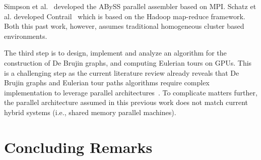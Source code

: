 \documentclass{acm_proc_article-sp}[12pt]
\begin{document}
Simpson et al.~\cite{simpson2009abyss} developed the ABySS parallel assembler based on MPI. Schatz et al. developed Contrail~\cite{schatz2010high} which is based on the Hadoop map-reduce framework. Both this past work, however, assumes traditional homogeneous cluster based environments.

The third step is to design, implement and analyze an algorithm for the construction of De Brujin graphs, and computing Eulerian tours on GPUs. This is a challenging step as the current literature review already reveals that De Brujin graphs and Eulerian tour paths algorithms require complex implementation to leverage parallel architectures~\cite{Quinn1984,Atallah1984}. To complicate matters further, the parallel architecture assumed in this previous work does not match current hybrid systems (i.e., shared memory parallel machines).

\section{Concluding Remarks}
\label{sec:conclusion}



\end{document}
